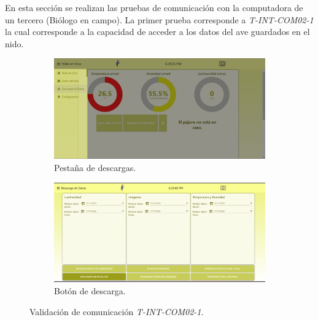 En esta sección se realizan las pruebas de comunicación con la computadora de un tercero (Biólogo en campo).
La primer prueba corresponde a \textit{T-INT-COM02-1} la cual corresponde a la capacidad de acceder a  los datos del ave guardados en el nido.
\begin{figure}[H]
\centering
    	\begin{subfigure}{0.49\textwidth}
        	\centering
        	\includegraphics[width=\linewidth]{ImagenesValidacion del prototipo/TINTCOM21a}		
			\caption{Pestaña de descargas.}
        \end{subfigure}\hfill
        \begin{subfigure}{0.49\textwidth}
        	\centering
        	\includegraphics[width=\linewidth]{ImagenesValidacion del prototipo/TINTCOM21b}
        	\caption{Botón de descarga.}
        \end{subfigure}
	\caption{Validación de comunicación \textit{T-INT-COM02-1}.}
\end{figure}


